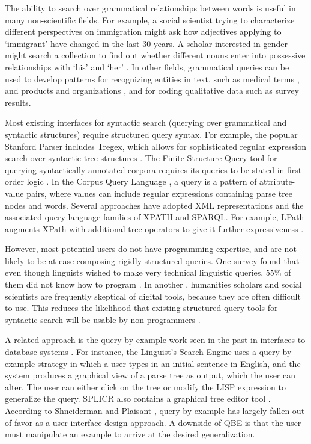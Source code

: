 
The ability to search over grammatical relationships between words is useful in many non-scientific fields. For example, a social scientist trying to characterize different perspectives on immigration might ask how adjectives applying to `immigrant' have changed in the last 30 years. A scholar interested in gender might search a collection to find out whether different nouns enter into possessive relationships with `his' and `her' \cite{muralidharan2013supporting}. In other fields, grammatical queries can be used to develop patterns for recognizing entities in text, such as medical terms \cite{hirschman2005overview,maclean2013identifying}, and  products and organizations \cite{culotta2005reducing}, and for coding qualitative data such as survey results.

Most existing interfaces for syntactic search (querying over grammatical and syntactic structures) require structured query syntax. For example, the popular Stanford Parser includes Tregex, which allows for sophisticated regular expression search over syntactic tree structures \cite{levy2006tregex}.
The Finite Structure Query tool for querying syntactically annotated corpora requires its queries to be stated in first order logic \cite{kepser2003finite}. In the Corpus Query Language \cite{jakubicek2010fast}, a query is a pattern of attribute-value pairs, where values can include regular expressions containing parse tree nodes and words.
Several approaches have adopted XML representations and the associated query language families of XPATH and SPARQL. For example, LPath augments XPath with additional tree operators to give it further expressiveness \cite{lai2010querying}.

However, most potential users do not have programming expertise, and are not likely to be at ease composing rigidly-structured queries. One survey found that even though linguists wished to make very technical  linguistic queries, 55\% of them did not know how to program \cite{soehn2008requirements}. In another \cite{gibbs_building_2012}, humanities scholars and social scientists are frequently skeptical of digital tools, because they are often difficult to use. This reduces the likelihood that existing structured-query tools for syntactic search will be usable by non-programmers \cite{ogden1983query}.

A related approach is the query-by-example work seen in the past in interfaces to database systems \cite{androutsopoulos1995natural}. For instance, the Linguist's Search Engine \cite{resnik2005web} uses a query-by-example strategy in which a user types in an initial sentence in English, and the system produces a graphical view of a parse tree as output, which the user can alter. 
The user can either click on the tree or modify the LISP expression to generalize the query. SPLICR also contains a graphical tree editor tool \cite{rehm2009sustainability}. 
According to Shneiderman and Plaisant , query-by-example has largely fallen out of favor as a user interface design approach. A downside of QBE is that the user must manipulate an example to arrive at the desired generalization.

